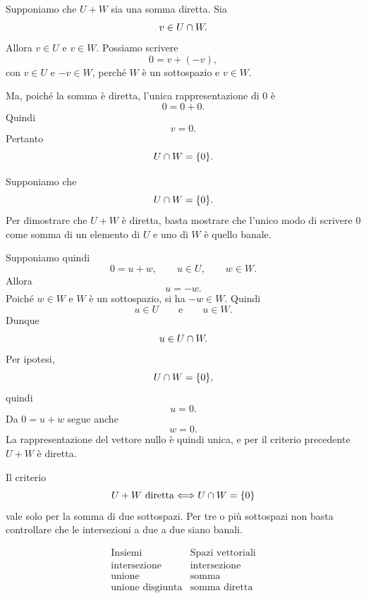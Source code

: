 \documentclass[a4paper]{article}
\begin{document}
\begin{snippetproof}{}
    \begin{iffproof}
    \item Supponiamo che \(U+W\) sia una somma diretta. Sia
        \[
            v\in U\cap W.
        \]
        Allora \(v\in U\) e \(v\in W\). Possiamo scrivere
        \[
            0=v+(-v),
        \]
        con \(v\in U\) e \(-v\in W\), perché \(W\) è un sottospazio e \(v\in W\).

        Ma, poiché la somma è diretta, l'unica rappresentazione di \(0\) è
        \[
            0=0+0.
        \]
        Quindi
        \[
            v=0.
        \]
        Pertanto
        \[
            U\cap W=\{0\}.
        \]

    \item Supponiamo che
        \[
            U\cap W=\{0\}.
        \]
        Per dimostrare che \(U+W\) è diretta, basta mostrare che l'unico modo di scrivere \(0\) come somma di un elemento di \(U\) e uno di \(W\) è quello banale.

        Supponiamo quindi
        \[
            0=u+w,
            \qquad
            u\in U,
            \qquad
            w\in W.
        \]
        Allora
        \[
            u=-w.
        \]
        Poiché \(w\in W\) e \(W\) è un sottospazio, si ha \(-w\in W\). Quindi
        \[
            u\in U
            \qquad
            \text{e}
            \qquad
            u\in W.
        \]
        Dunque
        \[
            u\in U\cap W.
        \]
        Per ipotesi,
        \[
            U\cap W=\{0\},
        \]
        quindi
        \[
            u=0.
        \]
        Da \(0=u+w\) segue anche
        \[
            w=0.
        \]
        La rappresentazione del vettore nullo è quindi unica, e per il criterio precedente \(U+W\) è diretta.
    \end{iffproof}
\end{snippetproof}

Il criterio
\[
    U+W \text{ diretta}
    \Longleftrightarrow
    U\cap W=\{0\}
\]
vale solo per la somma di due sottospazi. Per tre o più sottospazi non basta controllare che le intersezioni a due a due siano banali.

\[
    \begin{array}{c|c}
        \text{Insiemi} & \text{Spazi vettoriali}\\
        \hline
        \text{intersezione} & \text{intersezione}\\
        \text{unione} & \text{somma}\\
        \text{unione disgiunta} & \text{somma diretta}
    \end{array}
\]
\end{document}
